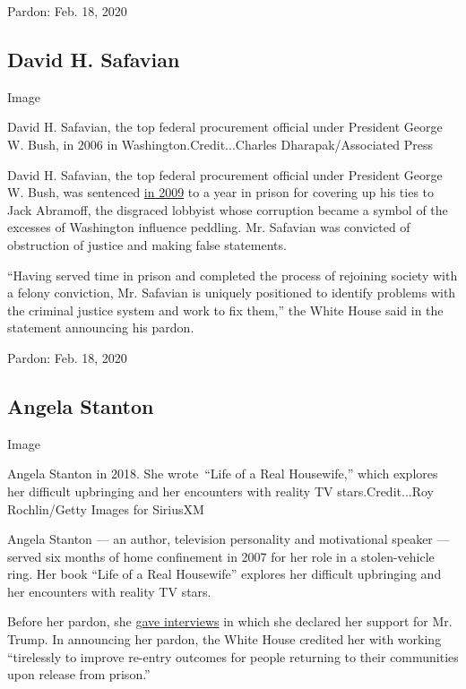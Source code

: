 Pardon: Feb. 18, 2020

\hypertarget{david-h-safavian}{%
\subsection{David H. Safavian}\label{david-h-safavian}}

Image

David H. Safavian, the top federal procurement official under President
George W. Bush, in 2006 in Washington.Credit...Charles
Dharapak/Associated Press

David H. Safavian, the top federal procurement official under President
George W. Bush, was sentenced
\href{https://www.justice.gov/opa/pr/former-gsa-chief-staff-david-safavian-sentenced-obstruction-justice-and-making-false}{in
2009} to a year in prison for covering up his ties to Jack Abramoff, the
disgraced lobbyist whose corruption became a symbol of the excesses of
Washington influence peddling. Mr. Safavian was convicted of obstruction
of justice and making false statements.

``Having served time in prison and completed the process of rejoining
society with a felony conviction, Mr. Safavian is uniquely positioned to
identify problems with the criminal justice system and work to fix
them,'' the White House said in the statement announcing his pardon.

Pardon: Feb. 18, 2020

\hypertarget{angela-stanton}{%
\subsection{Angela Stanton}\label{angela-stanton}}

Image

Angela Stanton in 2018. She wrote~``Life of a Real Housewife,'' which
explores her difficult upbringing and her encounters with reality TV
stars.Credit...Roy Rochlin/Getty Images for SiriusXM

Angela Stanton --- an author, television personality and motivational
speaker --- served six months of home confinement in 2007 for her role
in a stolen-vehicle ring. Her book ``Life of a Real Housewife'' explores
her difficult upbringing and her encounters with reality TV stars.

Before her pardon, she
\href{https://waok.radio.com/blogs/on-point-with-juandolyn-stokes/angela-stanton-king-talks-adversity-and-support-for-trump}{gave
interviews} in which she declared her support for Mr. Trump. In
announcing her pardon, the White House credited her with working
``tirelessly to improve re-entry outcomes for people returning to their
communities upon release from prison.''

